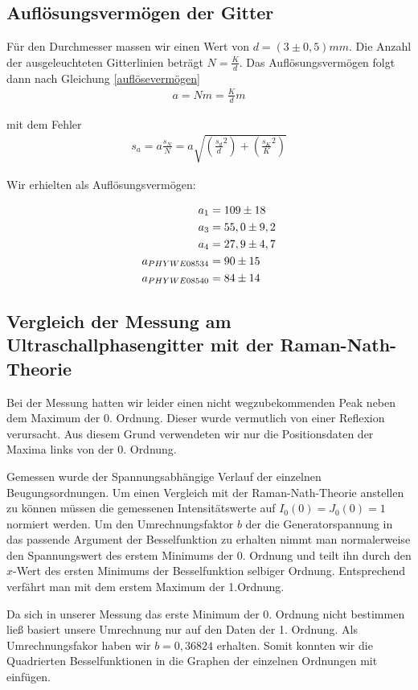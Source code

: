 \documentclass[12pt]{article}
\begin{document}
\subsection{Auflösungsvermögen der Gitter}
Für den Durchmesser massen wir einen Wert von $d=(3 \pm 0,5)mm$. Die Anzahl der ausgeleuchteten Gitterlinien beträgt
$N=\frac{K}{d}$. Das Auflösungsvermögen folgt dann nach Gleichung \ref{auflösevermögen} 
\begin{align}
 a=Nm=\frac{K}{d}m
\end{align}

mit dem Fehler 
\begin{align}
 s_a=a\frac{s_N}{N}=a\sqrt{\left( \frac{s_d}{d}^2 \right) + \left( \frac{s_K}{K}^2 \right) }
\end{align}

Wir erhielten als Auflösungsvermögen:

\begin{align}
 \notag
a_1 &=  109 \pm  18\\
 \notag
a_3 &=  55,0 \pm  9,2\\
 \notag
a_4 &=  27,9 \pm  4,7\\
 \notag
a_{PHYWE08534} &= 90 \pm 15\\
 \notag
a_{PHYWE08540} &= 84 \pm 14
\end{align}

\subsection{Vergleich der Messung am Ultraschallphasengitter mit der Raman-Nath-Theorie}
Bei der Messung hatten wir leider einen nicht wegzubekommenden Peak neben dem Maximum der 0. Ordnung. Dieser wurde vermutlich von einer Reflexion
verursacht. Aus diesem Grund verwendeten wir nur die Positionsdaten der Maxima links von der 0. Ordnung.

Gemessen wurde der Spannungsabhängige Verlauf der einzelnen Beugungsordnungen. Um einen Vergleich mit der Raman-Nath-Theorie anstellen zu können müssen
die gemessenen Intensitätswerte auf $I_0(0) = J_0(0) = 1$ normiert werden. Um den Umrechnungsfaktor $b$ der die Generatorspannung in das passende Argument
der Besselfunktion zu erhalten nimmt man normalerweise den Spannungswert des erstem Minimums der 0. Ordnung und teilt ihn durch den $x$-Wert des ersten
Minimums der Besselfunktion selbiger Ordnung. Entsprechend verfährt man mit dem erstem Maximum der 1.Ordnung. 

Da sich in unserer Messung das erste Minimum der 0. Ordnung nicht bestimmen ließ basiert unsere Umrechnung nur auf den Daten der 1. Ordnung.
Als Umrechnungsfakor haben wir $b = 0,36824$ erhalten. Somit konnten wir die Quadrierten Besselfunktionen in die Graphen der einzelnen Ordnungen mit 
einfügen.
\end{document}
